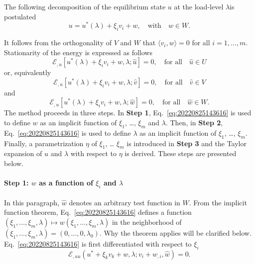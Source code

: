 \documentclass[12pt, final]{scrartcl}
\theoremstyle{definition}
\newcommand{\E}{\mathcal E}
\begin{document}
The following decomposition of the equilibrium state $u$ at the load-level
$\lambda$is postulated
\begin{equation}
  \label{eq:20220902174235}
  u = u^\ast(\lambda) + \xi_i v_i + w, \quad \text{with} \quad w \in W.
\end{equation}

It follows from the orthogonality of $V$ and $W$ that $\langle v_i, w\rangle = 0$ for
all $i=1, \ldots, m$. Stationarity of the energy is expressed as follows
\begin{equation}
  \E_{,u}[u^\ast(\lambda) + \xi_i v_i + w, \lambda; \hat{u}] = 0, \quad \text{for all} \quad \hat{u} \in U
\end{equation}
or, equivalently
\begin{equation}
  \label{eq:20220901120544}
  \E_{,u}[u^\ast(\lambda) + \xi_i v_i + w, \lambda; \hat{v}] = 0, \quad \text{for all} \quad \hat{v} \in V
\end{equation}
and
\begin{equation}
  \label{eq:20220825143616}
  \E_{,u}[u^\ast(\lambda) + \xi_i v_i + w, \lambda; \hat{w}] = 0, \quad \text{for all} \quad \hat{w} \in W.
\end{equation}
The method proceeds in three steps. In \textbf{Step 1},
Eq.~\eqref{eq:20220825143616} is used to define $w$ as an implicit function of
$\xi_1$, \dots, $\xi_m$ and $\lambda$. Then, in \textbf{Step 2},
Eq.~\eqref{eq:20220825143616} is used to define $\lambda$ as an implicit function of
$\xi_1$, \dots, $\xi_m$. Finally, a parametrization $\eta$ of $\xi_1$, \dots
$\xi_m$ is introduced in \textbf{Step 3} and the Taylor expansion of $u$ and
$\lambda$ with respect to $\eta$ is derived. These steps are presented below.

\paragraph{Step 1: $w$ as a function of $\xi_i$ and $\lambda$} In this paragraph,
$\hat{w}$ denotes an arbitrary test function in $W$. From the implicit
function theorem, Eq.~\eqref{eq:20220825143616} defines a function
$(\xi_1, \ldots, \xi_m, \lambda) \mapsto w(\xi_1, \ldots, \xi_m, \lambda)$ in the neighborhood of
$(\xi_1, \ldots, \xi_m, \lambda) = (0, \ldots, 0, \lambda_0)$. Why the theorem applies will be
clarified below. Eq.~\eqref{eq:20220825143616} is first differentiated with respect to
$\xi_i$
\begin{equation}
  \label{eq:20220826140926}
  \E_{,uu}(u^\ast + \xi_k v_k + w, \lambda; v_i + w_{,i}, \hat{w}) = 0.
\end{equation}
\end{document}
